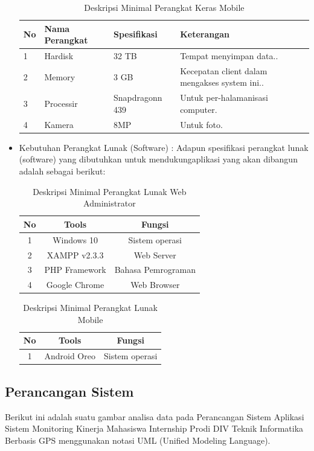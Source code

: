 \begin{itemize}
\begin{table}[h!]
\centering
\begin{tabular}{| l | l | p{3cm} | p{3cm} |} 
 \hline
 \textbf{No}   & \textbf{Nama Perangkat} & \textbf{Spesifikasi} &\textbf{Keterangan}\\ 
\hline
1   & Hardisk & 32 TB & Tempat menyimpan data.. \\ 
\hline
2   & Memory & 3 GB & Kecepatan client dalam mengakses system ini.. \\ 
\hline
3   & Processir & Snapdragonn 439 & Untuk per-halamanisasi computer. \\ 
 \hline
4   & Kamera & 8MP & Untuk foto. \\ 
 \hline
\end{tabular}
\caption{Deskripsi Minimal Perangkat Keras Mobile}
\label{table:3}
\end{table}
	\item Kebutuhan Perangkat Lunak (Software) : Adapun spesifikasi perangkat lunak (software) yang dibutuhkan untuk mendukungaplikasi yang akan dibangun adalah sebagai berikut:
\begin{table}[h!]
\centering
\begin{tabular}{|c|c|c|} 
 \hline
 \textbf{No}   & \textbf{Tools} & \textbf{Fungsi}\\ 
\hline
1   & Windows 10 & Sistem operasi  \\ 
\hline
2   & XAMPP v2.3.3 & Web Server\\ 
\hline
3   & PHP Framework & Bahasa Pemrograman\\ 
 \hline
4   & Google Chrome& Web Browser  \\ 
 \hline
\end{tabular}
\caption{Deskripsi Minimal Perangkat Lunak Web Administrator}
\label{table:4}
\end{table}

\begin{table}[h!]
\centering
\begin{tabular}{|c|c|c|} 
 \hline
 \textbf{No}   & \textbf{Tools} & \textbf{Fungsi}\\ 
\hline
1   & Android Oreo & Sistem operasi  \\ 
 \hline
\end{tabular}
\caption{Deskripsi Minimal Perangkat Lunak Mobile}
\label{table:5}
\end{table}
\end{itemize}
\subsection{Perancangan Sistem}	
Berikut ini adalah suatu gambar analisa data pada Perancangan Sistem Aplikasi Sistem Monitoring Kinerja Mahasiswa Internship Prodi DIV Teknik Informatika Berbasis GPS menggunakan notasi UML (Unified Modeling Language).
